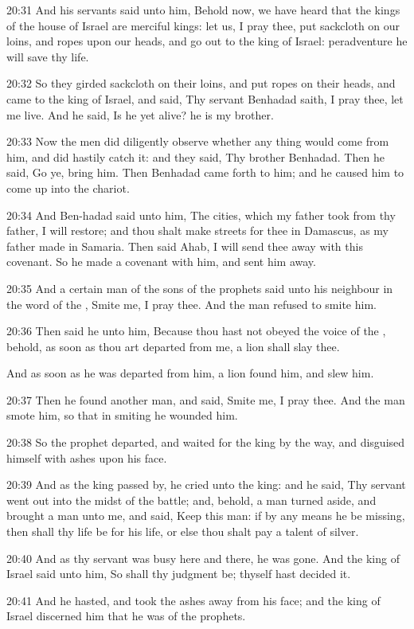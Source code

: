 20:31 And his servants said unto him, Behold now, we have heard that the kings of the house of Israel are merciful kings: let us, I pray thee, put sackcloth on our loins, and ropes upon our heads, and go out to the king of Israel: peradventure he will save thy life.

20:32 So they girded sackcloth on their loins, and put ropes on their heads, and came to the king of Israel, and said, Thy servant Benhadad saith, I pray thee, let me live. And he said, Is he yet alive? he is my brother.

20:33 Now the men did diligently observe whether any thing would come from him, and did hastily catch it: and they said, Thy brother Benhadad. Then he said, Go ye, bring him. Then Benhadad came forth to him; and he caused him to come up into the chariot.

20:34 And Ben-hadad said unto him, The cities, which my father took from thy father, I will restore; and thou shalt make streets for thee in Damascus, as my father made in Samaria. Then said Ahab, I will send thee away with this covenant. So he made a covenant with him, and sent him away.

20:35 And a certain man of the sons of the prophets said unto his neighbour in the word of the \LORD, Smite me, I pray thee. And the man refused to smite him.

20:36 Then said he unto him, Because thou hast not obeyed the voice of the \LORD, behold, as soon as thou art departed from me, a lion shall slay thee.

And as soon as he was departed from him, a lion found him, and slew him.

20:37 Then he found another man, and said, Smite me, I pray thee. And the man smote him, so that in smiting he wounded him.

20:38 So the prophet departed, and waited for the king by the way, and disguised himself with ashes upon his face.

20:39 And as the king passed by, he cried unto the king: and he said, Thy servant went out into the midst of the battle; and, behold, a man turned aside, and brought a man unto me, and said, Keep this man: if by any means he be missing, then shall thy life be for his life, or else thou shalt pay a talent of silver.

20:40 And as thy servant was busy here and there, he was gone. And the king of Israel said unto him, So shall thy judgment be; thyself hast decided it.

20:41 And he hasted, and took the ashes away from his face; and the king of Israel discerned him that he was of the prophets.


